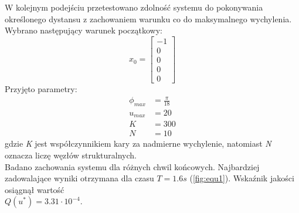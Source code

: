 \newpage
W kolejnym podejściu przetestowano zdolność systemu do pokonywania określonego dystansu z zachowaniem warunku co do maksymalnego wychylenia. Wybrano następujący warunek początkowy:
\begin{equation}
x_0=\begin{bmatrix}
-1\\
0\\
0\\
0\\
0
\end{bmatrix}
\end{equation}
Przyjęto parametry:
\begin{equation}
\begin{aligned}
\phi_{max}&=\frac{\pi}{18}\\
u_{max}&=20\\
K&=300\\
N&=10
\end{aligned}
\end{equation}
gdzie \textit{K} jest współczynnikiem kary za nadmierne wychylenie, natomiast \textit{N} oznacza liczę węzłów strukturalnych.\\
Badano zachowania systemu dla różnych chwil końcowych. Najbardziej zadowalające wyniki otrzymana dla czasu $\textit{T}=1.6 s$ (\ref{fig:equ1}). Wskaźnik jakości osiągnął wartość\\ $Q(u^*)=3.31\cdot10^{-4}$.
